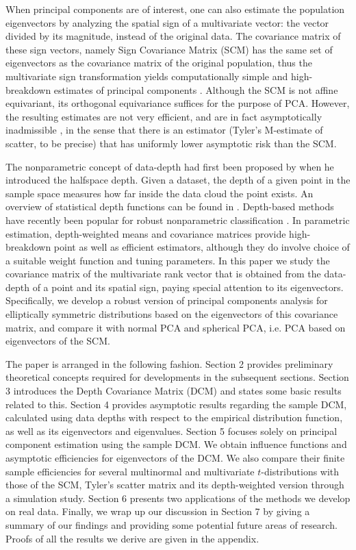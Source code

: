 \documentclass[10pt]{book}
\begin{document}
When principal components are of interest, one can also estimate the population eigenvectors by analyzing the spatial sign of a multivariate vector: the vector divided by its magnitude, instead of the original data. The covariance matrix of these sign vectors, namely Sign Covariance Matrix (SCM) has the same set of eigenvectors as the covariance matrix of the original population, thus the multivariate sign transformation yields computationally simple and high-breakdown estimates of principal components \citep{locantore99, visuri00}. Although the SCM is not affine equivariant, its orthogonal equivariance suffices for the purpose of PCA. However, the resulting estimates are not very efficient, and are in fact asymptotically inadmissible \citep{magyar14}, in the sense that there is an estimator (Tyler's M-estimate of scatter, to be precise) that has uniformly lower asymptotic risk than the SCM.

The nonparametric concept of data-depth had first been proposed by \cite{tukey75} when he introduced the halfspace depth. Given a dataset, the depth of a given point in the sample space measures how far inside the data cloud the point exists. An overview of statistical depth functions can be found in \citep{zuo00}. Depth-based methods have recently been popular for robust nonparametric classification \citep{jornsten04, ghosh05, dutta12, sguera14}. In parametric estimation, depth-weighted means \citep{ZuoCuiHe04} and covariance matrices \citep{ZuoCui05} provide high-breakdown point as well as efficient estimators, although they do involve choice of a suitable weight function and tuning parameters. In this paper we study the covariance matrix of the multivariate rank vector that is obtained from the data-depth of a point and its spatial sign, paying special attention to its eigenvectors. Specifically, we develop a robust version of principal components analysis for elliptically symmetric distributions based on the eigenvectors of this covariance matrix, and compare it with normal PCA and spherical PCA, i.e. PCA based on eigenvectors of the SCM.

The paper is arranged in the following fashion. Section 2 provides preliminary theoretical concepts required for developments in the subsequent sections. Section 3 introduces the Depth Covariance Matrix (DCM) and states some basic results related to this. Section 4 provides asymptotic results regarding the sample DCM, calculated using data depths with respect to the empirical distribution function, as well as its eigenvectors and eigenvalues. Section 5 focuses solely on principal component estimation using the sample DCM. We obtain influence functions and asymptotic efficiencies for eigenvectors of the DCM. We also compare their finite sample efficiencies for several multinormal and multivariate $t$-distributions with those of the SCM, Tyler's scatter matrix and its depth-weighted version through a simulation study. Section 6 presents two applications of the methods we develop on real data. Finally, we wrap up our discussion in Section 7 by giving a summary of our findings and providing some potential future areas of research. Proofs of all the results we derive are given in the appendix.
\par
\end{document}
